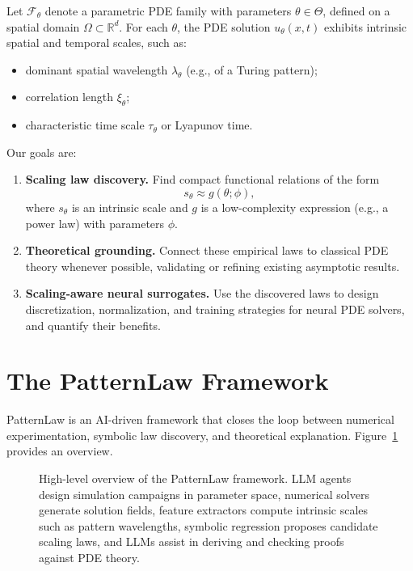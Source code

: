 \documentclass{article}
\theoremstyle{plain}
\theoremstyle{definition}
\theoremstyle{remark}
\newcommand{\R}{\mathbb{R}}
\begin{document}
Let $\mathcal{F}_\theta$ denote a parametric PDE family with parameters $\theta\in\Theta$, defined on a spatial domain $\Omega\subset\R^d$. For each $\theta$, the PDE solution $u_\theta(x,t)$ exhibits intrinsic spatial and temporal scales, such as:
\begin{itemize}
    \item dominant spatial wavelength $\lambda_\theta$ (e.g., of a Turing pattern);
    \item correlation length $\xi_\theta$;
    \item characteristic time scale $\tau_\theta$ or Lyapunov time.
\end{itemize}
Our goals are:
\begin{enumerate}
    \item \textbf{Scaling law discovery.} Find compact functional relations of the form
    \begin{equation}
        s_\theta \approx g(\theta; \phi),
    \end{equation}
    where $s_\theta$ is an intrinsic scale and $g$ is a low-complexity expression (e.g., a power law) with parameters $\phi$.
    \item \textbf{Theoretical grounding.} Connect these empirical laws to classical PDE theory whenever possible, validating or refining existing asymptotic results.
    \item \textbf{Scaling-aware neural surrogates.} Use the discovered laws to design discretization, normalization, and training strategies for neural PDE solvers, and quantify their benefits.
\end{enumerate}

\section{The PatternLaw Framework}

PatternLaw is an AI-driven framework that closes the loop between numerical experimentation, symbolic law discovery, and theoretical explanation. Figure~\ref{fig:pipeline} provides an overview.

\begin{figure}[t]
    \centering
    \caption{High-level overview of the PatternLaw framework. LLM agents design simulation campaigns in parameter space, numerical solvers generate solution fields, feature extractors compute intrinsic scales such as pattern wavelengths, symbolic regression proposes candidate scaling laws, and LLMs assist in deriving and checking proofs against PDE theory.}
    \label{fig:pipeline}
\end{figure}
\end{document}
